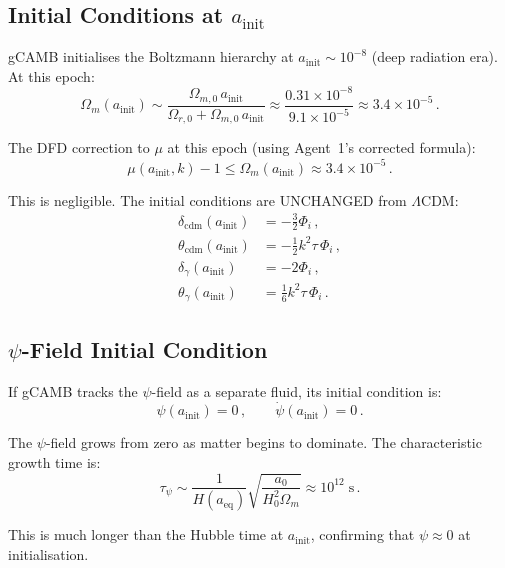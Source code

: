 \documentclass[11pt,a4paper]{article}
\begin{document}
\subsection{Initial Conditions at $a_{\mathrm{init}}$}

gCAMB initialises the Boltzmann hierarchy at $a_{\mathrm{init}} \sim 10^{-8}$ (deep radiation era). At this epoch:
\begin{equation}
\Omega_m(a_{\mathrm{init}}) \sim \frac{\Omega_{m,0}\,a_{\mathrm{init}}}{\Omega_{r,0} + \Omega_{m,0}\,a_{\mathrm{init}}} \approx \frac{0.31 \times 10^{-8}}{9.1 \times 10^{-5}} \approx 3.4 \times 10^{-5}\,.
\end{equation}

The DFD correction to $\mu$ at this epoch (using Agent~1's corrected formula):
\begin{equation}
\mu(a_{\mathrm{init}}, k) - 1 \leq \Omega_m(a_{\mathrm{init}}) \approx 3.4 \times 10^{-5}\,.
\end{equation}

This is negligible. The initial conditions are UNCHANGED from $\Lambda$CDM:
\begin{align}
\delta_{\mathrm{cdm}}(a_{\mathrm{init}}) &= -\frac{3}{2}\Phi_i\,, \\
\theta_{\mathrm{cdm}}(a_{\mathrm{init}}) &= -\frac{1}{2}k^2\tau\,\Phi_i\,, \\
\delta_\gamma(a_{\mathrm{init}}) &= -2\Phi_i\,, \\
\theta_\gamma(a_{\mathrm{init}}) &= \frac{1}{6}k^2\tau\,\Phi_i\,.
\end{align}

\subsection{$\psi$-Field Initial Condition}

If gCAMB tracks the $\psi$-field as a separate fluid, its initial condition is:
\begin{equation}
\psi(a_{\mathrm{init}}) = 0\,,\qquad \dot{\psi}(a_{\mathrm{init}}) = 0\,.
\end{equation}

The $\psi$-field grows from zero as matter begins to dominate. The characteristic growth time is:
\begin{equation}
\tau_\psi \sim \frac{1}{H(a_{\mathrm{eq}})}\sqrt{\frac{a_0}{H_0^2\Omega_m}} \approx 10^{12}\;\mathrm{s}\,.
\end{equation}

This is much longer than the Hubble time at $a_{\mathrm{init}}$, confirming that $\psi \approx 0$ at initialisation.
\end{document}

